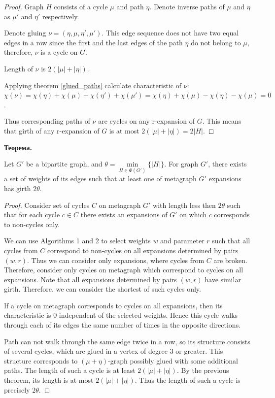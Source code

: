 \documentclass[14pt]{mmcs-article}
\begin{document}
\begin{proof}
    Graph $H$ consists of a cycle $\mu$ and path $\eta$. Denote inverse paths of $\mu$ and $\eta$ as $\mu'$ and $\eta'$ respectively.

    Denote gluing $\nu = (\eta, \mu, \eta', \mu')$. This edge sequence does not have two equal edges in a row since the first and the last edges of the path $\eta$ do not belong to $\mu$, therefore, $\nu$ is a cycle on $G$.

    Length of $\nu$ is $2(|\mu| + |\eta|)$.

    Applying theorem \ref{glued_paths} calculate characteristic of $\nu$: $\chi(\nu) = \chi(\eta) + \chi(\mu) + \chi(\eta') + \chi(\mu') = \chi(\eta) + \chi(\mu) - \chi(\eta) - \chi(\mu) = 0$.

    Thus corresponding paths of $\nu$ are cycles on any r-expansion of $G$. This means that girth of any r-expansion of $G$ is at most $2(|\mu| + |\eta|) = 2|H|$.
\end{proof}

\textbf{Теорема.}

Let $G'$ be a bipartite graph, and $\theta = \min\limits_{H \in \Phi(G')} \{ |H| \}$. For graph $G'$, there exists a set of weights of its edges such that at least one of metagraph $G'$ expansions has girth $2 \theta$.

\begin{proof}

Consider set of cycles $C$ on metagraph $G'$ with length less then $2 \theta$ such that for each cycle $c \in C$ there exists an expansions of $G'$ on which $c$ corresponds to non-cycles only. 

We can use Algorithms 1 and 2 to select weights $w$ and parameter $r$ such that all cycles from $C$ correspond to non-cycles on all expansions determined by pairs $(w, r)$. Thus we can consider only expansions, where cycles from $C$ are broken. Therefore, consider only cycles on metagraph which correspond to cycles on all expansions. Note that all expansions determined by pairs $(w, r)$ have similar girth. Therefore. we can consider the shortest of such cycles only.

If a cycle on metagraph corresponds to cycles on all expansions, then its characteristic is $0$ independent of the selected weights. Hence this cycle walks through each of its edges the same number of times in the opposite directions.

Path can not walk through the same edge twice in a row, so its structure consists of several cycles, which are glued in a vertex of degree $3$ or greater. This structure corresponds to $(\mu + \eta)$-graph possibly glued with some additional paths. The length of such a cycle is at least $2(|\mu| + |\eta|)$. By the previous theorem, its length is at most $2(|\mu| + |\eta|)$. Thus the length of such a cycle is precisely $2 \theta$.

\end{proof}
\end{document}
